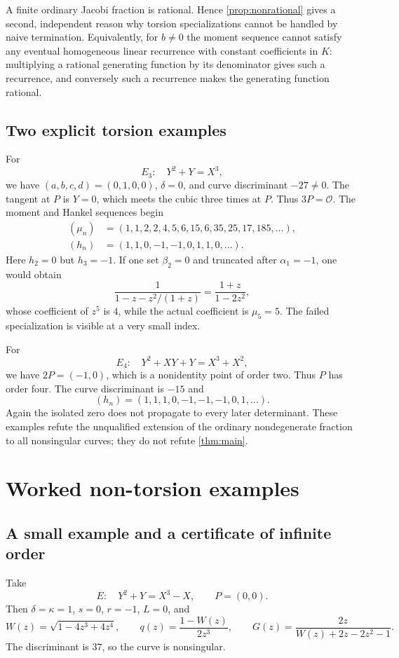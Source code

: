 \documentclass[11pt,letterpaper]{article}
\numberwithin{equation}{section}
\theoremstyle{definition}
\theoremstyle{remark}
\newcommand{\K}{K}
\newcommand{\OO}{\mathcal{O}}
\begin{document}
A finite ordinary Jacobi fraction is rational. Hence
\cref{prop:nonrational} gives a second, independent reason why torsion
specializations cannot be handled by naive termination. Equivalently, for
$b\ne0$ the moment sequence cannot satisfy any eventual homogeneous
linear recurrence with constant coefficients in $\K$: multiplying a
rational generating function by its denominator gives such a recurrence,
and conversely such a recurrence makes the generating function rational.

\subsection{Two explicit torsion examples}
For
\begin{equation}\label{eq:order3}
 E_3:\quad Y^2+Y=X^3,
\end{equation}
we have $(a,b,c,d)=(0,1,0,0)$, $\delta=0$, and curve discriminant
$-27\ne0$. The tangent at $P$ is $Y=0$, which meets the cubic three
times at $P$. Thus $3P=\OO$. The moment and Hankel sequences begin
\begin{align*}
 (\mu_n)&=(1,1,2,2,4,5,6,15,6,35,25,17,185,\ldots),\\
 (h_n)&=(1,1,0,-1,-1,0,1,1,0,\ldots).
\end{align*}
Here $h_2=0$ but $h_3=-1$. If one set $\beta_2=0$ and truncated after
$\alpha_1=-1$, one would obtain
\[
 \frac1{1-z-z^2/(1+z)}=\frac{1+z}{1-2z^2},
\]
whose coefficient of $z^5$ is $4$, while the actual coefficient is
$\mu_5=5$. The failed specialization is visible at a very small index.

For
\begin{equation}\label{eq:order4}
 E_4:\quad Y^2+XY+Y=X^3+X^2,
\end{equation}
we have $2P=(-1,0)$, which is a nonidentity point of order two. Thus $P$
has order four. The curve discriminant is $-15$ and
\[
 (h_n)=(1,1,1,0,-1,-1,-1,0,1,\ldots).
\]
Again the isolated zero does not propagate to every later determinant.
These examples refute the unqualified extension of the ordinary
nondegenerate fraction to all nonsingular curves; they do not refute
\cref{thm:main}.

\section{Worked non-torsion examples}\label{sec:examples}

\subsection{A small example and a certificate of infinite order}\label{subsec:small}
Take
\begin{equation}\label{eq:small}
 E:\quad Y^2+Y=X^3-X,\qquad P=(0,0).
\end{equation}
Then $\delta=\kappa=1$, $s=0$, $r=-1$, $L=0$, and
\begin{equation}\label{eq:smallG}
 W(z)=\sqrt{1-4z^3+4z^4},\qquad
 q(z)=\frac{1-W(z)}{2z^3},\qquad
 G(z)=\frac{2z}{W(z)+2z-2z^2-1}.
\end{equation}
The discriminant is $37$, so the curve is nonsingular.
\end{document}
